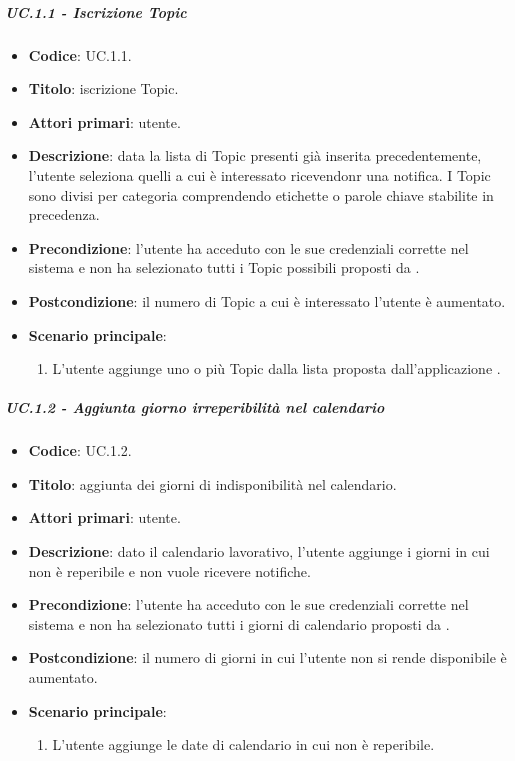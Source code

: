 	\subparagraph{UC\theuccount.1.1 - Iscrizione Topic}
	\begin{itemize}
		\item \textbf{Codice}: UC\theuccount.1.1.
		\item \textbf{Titolo}: iscrizione Topic.
		\item \textbf{Attori primari}: utente.
		\item \textbf{Descrizione}: data la lista di Topic presenti già inserita precedentemente, l'utente seleziona quelli a cui è interessato ricevendonr una notifica. I Topic sono divisi per categoria comprendendo etichette o parole chiave stabilite in precedenza.
		\item \textbf{Precondizione}: l'utente ha acceduto con le sue credenziali corrette nel sistema e non ha selezionato tutti i Topic possibili proposti da \progetto.
		\item \textbf{Postcondizione}: il numero di Topic a cui è interessato l'utente è aumentato.
		\item \textbf{Scenario principale}:
		\begin{enumerate}
			\item L'utente aggiunge uno o più Topic dalla lista proposta dall'applicazione \progetto.
		\end{enumerate}
	\end{itemize}
		
			
	\subparagraph{UC\theuccount.1.2 - Aggiunta giorno irreperibilità nel calendario} 
	\begin{itemize}
		\item \textbf{Codice}: UC\theuccount.1.2.
		\item \textbf{Titolo}: aggiunta dei giorni di indisponibilità nel calendario.
		\item \textbf{Attori primari}: utente.
		\item \textbf{Descrizione}: dato il calendario lavorativo, l'utente aggiunge i giorni in cui non è reperibile e non vuole ricevere notifiche.
		\item \textbf{Precondizione}: l'utente ha acceduto con le sue credenziali corrette nel sistema e non ha selezionato tutti i giorni di calendario proposti da \progetto.
		\item \textbf{Postcondizione}: il numero di giorni in cui l'utente non si rende disponibile è aumentato.
		\item \textbf{Scenario principale}:
		\begin{enumerate}
			\item L'utente aggiunge le date di calendario in cui non è reperibile.
		\end{enumerate}
	\end{itemize}
			
